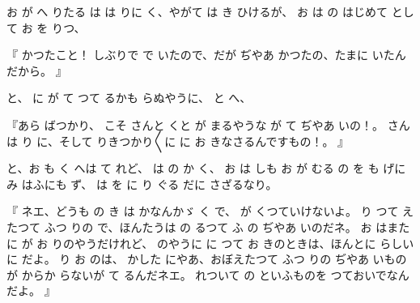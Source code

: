 お
が
へ
りたる
は
は
りに
く、やがて
は
き
ひけるが、
お
は
の
はじめて
として
お
を
りつ、

『
かつたこと！
しぶりで
で
いたので、だが
ぢやあ
かつたの、たまに
いたんだから。
』

と、
に
が
て
つて
るかも
らぬやうに、
と
へ、

『あら
ばつかり、
こそ
さんと
くと
が
まるやうな
が
て
ぢやあ
いの！。
さんは
り
に、そして
りきつかり〳〵に
に
お
きなさるんですもの！。
』

と、お
も
く
へは
て
れど、
は
の
か
く、
お
は
しも
お
が
むる
の
を
も
げに
み
はふにも
ず、
は
を
に
り
ぐる
だに
さざるなり。

『
ネエ、どうも
の
き
は
かなんかゞ
く
で、
が
くつていけないよ。
り
つて
えたつて
ふつ
りの
で、ほんたうは
の
るつて
ふ
の
ぢやあ
いのだネ。
お
はまた
に
が
お
りのやうだけれど、
のやうに
に
つて
お
きのときは、ほんとに
らしい
に
だよ。
り
お
のは、
かした
にやあ、おぼえたつて
ふつ
りの
ぢやあ
いものが
からか
らないが
て
るんだネエ。
れついて
の
といふものを
つておいでなんだよ。
』

